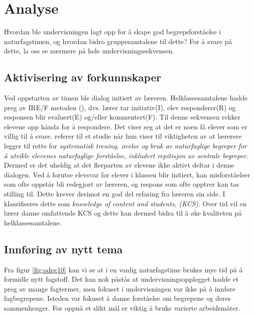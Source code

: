 \documentclass[main.tex]{subfiles}
\begin{document}
\section*{Analyse}
\label{sec:2}

Hvordan ble undervisningen lagt opp for å skape god begrepsforståelse i naturfagstimen, og hvordan 
bidro gruppesamtalene til dette? For å svare på dette, la oss se nærmere på hele 
undervisningssekvensen.
\newline
\newline
\subsection*{Aktivisering av forkunnskaper}
Ved oppstarten av timen ble dialog initiert av læreren. Helklassesamtalene hadde preg av
IRE/F metoden (), dvs. lærer tar initiativ(I), elev responderer(R) og responsen blir 
evaluert(E) og/eller kommentert(F). Til denne sekvensen rekker elevene opp hånda for å respondere. 
Det viser seg at det er noen få elever som er villig til å svare.  referer til 
et studie når hun viser til viktigheten av at lærerere legger til rette for \emph{systematisk 
trening, øvelse og bruk av naturfaglige begreper for å utvikle elevenes naturfaglige forståelse, 
inkludert repitisjon av sentrale begreper.} Dermed er det uheldig at det flerparten av elevene
ikke aktivt deltar i denne dialogen.
\newline
\newline
Ved å forutse elevsvar før elever i klassen blir initiert, kan misforståelser som 
ofte oppstår bli redegjort av læreren, og respons som ofte opptrer kan tas stilling til. Dette krever 
derimot en god del erfaring fra læreren sin side. I  klassifiseres dette som 
\emph{knowledge of content and students, (KCS)}. Over tid vil en lærer danne omfattende KCS og dette 
kan dermed bidra til å øke kvaliteten på helklassesamtalene. 

\subsection*{Innføring av nytt tema}
Fra figur \ref{fig:odeg10} kan vi se at i en vanlig naturfagstime brukes mye tid på å formidle 
nytt fagstoff. Det kan nok påstås at undervisningsopplegget hadde et preg av mange fagtermer, men 
fokuset i undervisningen var ikke på å innføre fagbegrepene. Isteden var fokuset å danne forståelse 
om begrepene og deres sammenhenger. For oppnå et slikt mål er viktig å bruke varierte 
arbeidsmåter. %
\end{document}
